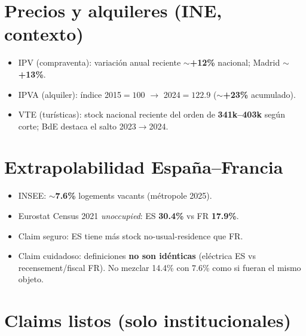 \documentclass[11pt,a4paper]{report}
\begin{document}
\section{Precios y alquileres (INE, contexto)}

\begin{itemize}
  \item IPV (compraventa): variaci\'on anual reciente $\sim$\textbf{+12\%} nacional;
        Madrid $\sim$\textbf{+13\%}.
  \item IPVA (alquiler): \'indice 2015$=100$ $\rightarrow$ 2024$=122.9$ ($\sim$\textbf{+23\%} acumulado).
  \item VTE (tur\'isticas): stock nacional reciente del orden de \textbf{341k--403k}
        seg\'un corte; BdE destaca el salto 2023$\rightarrow$2024.
\end{itemize}

\section{Extrapolabilidad Espa\~na--Francia}

\begin{dato}
\begin{itemize}
  \item INSEE: $\sim$\textbf{7.6\%} logements vacants (m\'etropole 2025).
  \item Eurostat Census 2021 \emph{unoccupied}: ES \textbf{30.4\%} vs FR \textbf{17.9\%}.
  \item Claim seguro: ES tiene m\'as stock no-usual-residence que FR.
  \item Claim cuidadoso: definiciones \textbf{no son id\'enticas} (el\'ectrica ES vs
        recensement/fiscal FR). No mezclar 14.4\% con 7.6\% como si fueran el mismo objeto.
\end{itemize}
\end{dato}

\section{Claims listos (solo institucionales)}
\end{document}
